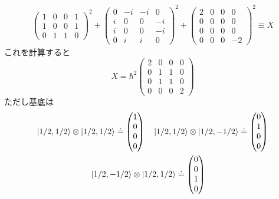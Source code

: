 \documentclass[uplatex,dvipdfmx, a4paper,11pt]{jsarticle}
\begin{document}
\begin{enumerate}[1.]
\begin{enumerate}[1）]
\begin{align*}
{\begin{pmatrix}
                1&0&0&1\\
                1&0&0&1\\
                0&1&1&0
            \end{pmatrix}^2+\begin{pmatrix}
                0&-i&-i&0\\
                i&0&0&-i\\
                i&0&0&-i\\
                0&i&i&0   
            \end{pmatrix}^2+
            \begin{pmatrix}
                2&0&0&0\\
                0&0&0&0\\
                0&0&0&0\\
                0&0&0&-2
            \end{pmatrix}^2
            }\equiv X
        \end{align*}
        これを計算すると
        \begin{equation}
            X=\hbar^2\begin{pmatrix}
                2&0&0&0\\
                0&1&1&0\\
                0&1&1&0\\
                0&0&0&2
            \end{pmatrix}
        \end{equation}
        ただし基底は
        \begin{gather*}
            \ket{1/2,1/2}\otimes\ket{1/2,1/2}\doteq\begin{pmatrix}
                1\\0\\0\\0
            \end{pmatrix}\quad 
            \ket{1/2,1/2}\otimes \ket{1/2,-1/2}\doteq\begin{pmatrix}
                0\\1\\0\\0
            \end{pmatrix}\\
            \ket{1/2,-1/2}\otimes\ket{1/2,1/2}\doteq \begin{pmatrix}
                0\\0\\1\\0
            \end{pmatrix}\quad

\end{gather*}
\end{enumerate}
\end{enumerate}
\end{document}
